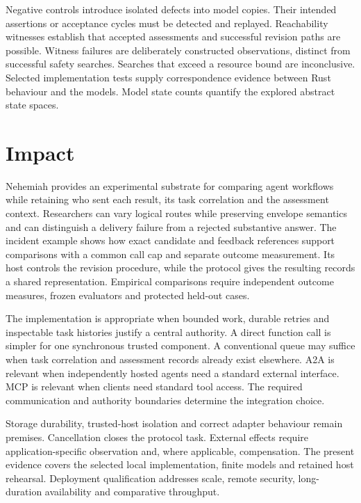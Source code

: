 \documentclass[preprint,12pt,a4paper]{elsarticle}
\begin{document}


Negative controls introduce isolated defects into model copies. Their intended assertions or acceptance cycles must be detected and replayed. Reachability witnesses establish that accepted assessments and successful revision paths are possible. Witness failures are deliberately constructed observations, distinct from successful safety searches. Searches that exceed a resource bound are inconclusive. Selected implementation tests supply correspondence evidence between Rust behaviour and the models. Model state counts quantify the explored abstract state spaces.

\section{Impact}
Nehemiah provides an experimental substrate for comparing agent workflows while retaining who sent each result, its task correlation and the assessment context. Researchers can vary logical routes while preserving envelope semantics and can distinguish a delivery failure from a rejected substantive answer. The incident example shows how exact candidate and feedback references support comparisons with a common call cap and separate outcome measurement. Its host controls the revision procedure, while the protocol gives the resulting records a shared representation. Empirical comparisons require independent outcome measures, frozen evaluators and protected held-out cases.

The implementation is appropriate when bounded work, durable retries and inspectable task histories justify a central authority. A direct function call is simpler for one synchronous trusted component. A conventional queue may suffice when task correlation and assessment records already exist elsewhere. A2A is relevant when independently hosted agents need a standard external interface. MCP is relevant when clients need standard tool access. The required communication and authority boundaries determine the integration choice.

Storage durability, trusted-host isolation and correct adapter behaviour remain premises. Cancellation closes the protocol task. External effects require application-specific observation and, where applicable, compensation. The present evidence covers the selected local implementation, finite models and retained host rehearsal. Deployment qualification addresses scale, remote security, long-duration availability and comparative throughput.
\end{document}
